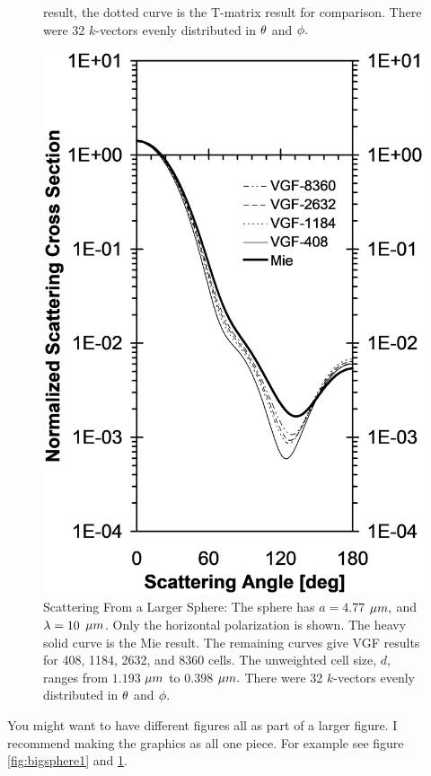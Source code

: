 \begin{figure}[!htb]
\begin{minipage}{.5\textwidth}
{			result, the dotted curve is the T-matrix result for comparison. 
			There were 32 $k$-vectors evenly distributed in $\protect\theta$ 
			and $\protect\phi.$
	     	\label{fig:bigsphere1}
		}
	\end{minipage}%
	\begin{minipage}{0.5\textwidth}
		\centering
		\includegraphics[width=0.9\linewidth, height=0.35\textheight]{test70}
		\caption{Scattering From a Larger Sphere: The sphere has $a=4.77$ $\protect\mu m,$ and $\protect\lambda =10$ $\protect\mu m$. Only the horizontal polarization is shown. The heavy solid curve is the Mie result. The remaining curves give VGF results for 408, 1184, 2632, and 8360 cells. \thinspace The unweighted cell size, $d$, ranges from $1.193$ $\protect\mu m$ to $0.398$ $\protect\mu m.$ There were 32 $k$-vectors evenly distributed in $\protect\theta $ and $\protect\phi.$ \vspace{0.8in}}
		\label{fig:bigsphere2}
	\end{minipage}
\end{figure}
You might want to have different figures all as part of a larger figure. I recommend making the graphics as all one piece.  For example see figure \ref{fig:bigsphere1} and \ref{fig:bigsphere2}.
